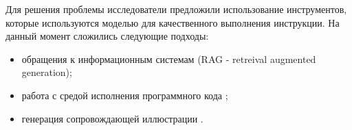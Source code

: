 Для решения проблемы исследователи предложили использование инструментов, которые используются моделью для качественного
выполнения инструкции. На данный момент сложились следующие подходы:
\begin{itemize}
    \item обращения к информационным системам (RAG - retreival augmented generation)\cite{lewis2020retrieval};
    \item работа с средой исполнения программного кода \cite{parisi2022talm};
    \item генерация сопровождающей иллюстрации \cite{rombach2022high}.
\end{itemize}










